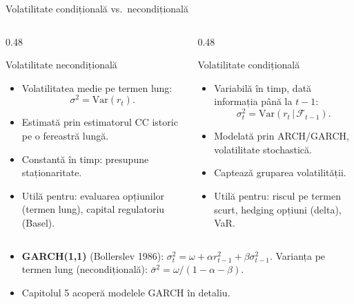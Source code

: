 \documentclass[9pt, aspectratio=169, t]{beamer}
\theoremstyle{definition}
\newcommand{\Var}{\text{Var}}
\begin{document}
\begin{frame}{Volatilitate condițională vs.\ necondițională}
\begin{columns}[T]
\begin{column}{0.48\textwidth}
\begin{block}{Volatilitate necondițională}
\begin{itemize}
    \item Volatilitatea medie pe termen lung:
    \[
    \sigma^2 = \Var(r_t).
    \]
    \item Estimată prin estimatorul CC istoric pe o fereastră lungă.
    \item Constantă în timp: presupune staționaritate.
    \item Utilă pentru: evaluarea opțiunilor (termen lung), capital regulatoriu (Basel).
\end{itemize}
\end{block}
\end{column}
\begin{column}{0.48\textwidth}
\begin{block}{Volatilitate condițională}
\begin{itemize}
    \item Variabilă în timp, dată informația până la $t-1$:
    \[
    \sigma_t^2 = \Var(r_t \,|\, \mathcal{F}_{t-1}).
    \]
    \item Modelată prin ARCH/GARCH, volatilitate stochastică.
    \item Captează gruparea volatilității.
    \item Utilă pentru: riscul pe termen scurt, hedging opțiuni (delta), VaR.
\end{itemize}
\end{block}
\end{column}
\end{columns}
\vspace{0.15cm}
\begin{itemize}
    \item \textbf{GARCH(1,1)} (Bollerslev 1986): $\sigma_t^2 = \omega + \alpha r_{t-1}^2 + \beta\sigma_{t-1}^2$. Varianța pe termen lung (necondițională): $\bar{\sigma}^2 = \omega/(1-\alpha-\beta)$.
    \item Capitolul 5 acoperă modelele GARCH în detaliu.
\end{itemize}
\end{frame}
\end{document}
